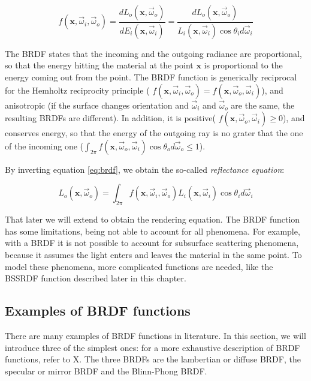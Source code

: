 \begin{equation}
f(\mathbf{x}, \vec{\omega}_i, \vec{\omega}_o) = \frac{d L_o(\mathbf{x}, \vec{\omega}_o)}{d E_i(\mathbf{x}, \vec{\omega}_i)} = \frac{d L_o(\mathbf{x}, \vec{\omega}_o)}{L_i(\mathbf{x}, \vec{\omega}_i) \cos\theta_i d \vec{\omega}_i}
\label{eq:brdf}
\end{equation}

The BRDF states that the incoming and the outgoing radiance are proportional, so that the energy hitting the material at the point $\mathbf{x}$ is proportional to the energy coming out from the point. The BRDF function is generically reciprocal for the Hemholtz reciprocity principle ( $f(\mathbf{x}, \vec{\omega}_i, \vec{\omega}_o) = f(\mathbf{x}, \vec{\omega}_o, \vec{\omega}_i)$), and anisotropic (if the surface changes orientation and $\vec{\omega}_i$ and $\vec{\omega}_o$ are the same, the resulting BRDFs are different). In addition, it is positive( $f(\mathbf{x}, \vec{\omega}_o, \vec{\omega}_i) \ge 0$), and conserves energy, so that the energy of the outgoing ray is no grater that the one of the incoming one ($\int_{2\pi}  f(\mathbf{x}, \vec{\omega}_o, \vec{\omega}_i) \cos\theta_o d\vec{\omega}_o \le 1$).

By inverting equation \ref{eq:brdf}, we obtain the so-called \emph{reflectance equation}:

$$
L_o(\mathbf{x}, \vec{\omega}_o) = \int_{2\pi} f(\mathbf{x}, \vec{\omega}_i, \vec{\omega}_o) L_i(\mathbf{x}, \vec{\omega}_i) \cos\theta_i d\vec{\omega}_i
$$

That later we will extend to obtain the rendering equation. The BRDF function has some limitations, being not able to account for all phenomena. For example, with a BRDF it is not possible to account for subsurface scattering phenomena, because it assumes the light enters and leaves the material in the same point. To model these phenomena, more complicated functions are needed, like the BSSRDF function described later in this chapter. 

\subsection{Examples of BRDF functions}

There are many examples of BRDF functions in literature. In this section, we will introduce three of the simplest ones: for a more exhaustive description of BRDF functions, refer to X. The three BRDFs are the lambertian or diffuse BRDF, the specular or mirror BRDF and the Blinn-Phong BRDF.

